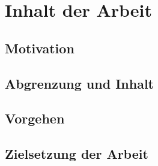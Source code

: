 

\chapter{Inhalt der Arbeit}


\section{Motivation}


\section{Abgrenzung und Inhalt}


\section{Vorgehen}


\section{Zielsetzung der Arbeit}

 
